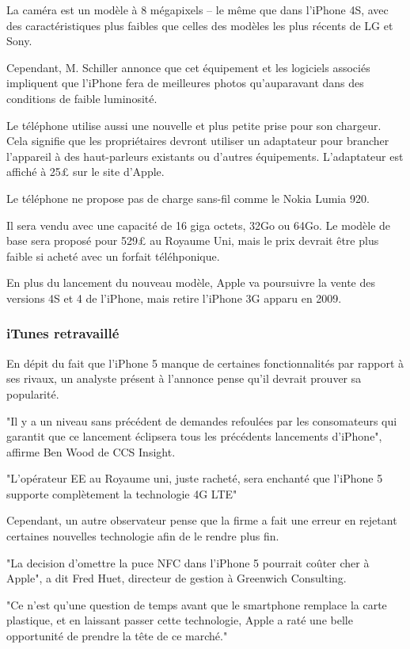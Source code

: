 \documentclass[a4paper, 11pt]{article}
\begin{document}
La caméra est un modèle à 8 mégapixels -- le même que dans l'iPhone 4S, avec des caractéristiques plus faibles que
celles des modèles les plus récents de LG et Sony.

Cependant, M. Schiller annonce que cet équipement et les logiciels associés impliquent que l'iPhone fera de
meilleures photos qu'auparavant dans des conditions de faible luminosité.

Le téléphone utilise aussi une nouvelle et plus petite prise pour son chargeur.
Cela signifie que les propriétaires devront utiliser un adaptateur pour brancher l'appareil à des haut-parleurs
existants ou d'autres équipements.
L'adaptateur est affiché à 25£ sur le site d'Apple.

Le téléphone ne propose pas de charge sans-fil comme le Nokia Lumia 920.

Il sera vendu avec une capacité de 16 giga octets, 32Go ou 64Go.
Le modèle de base sera proposé pour 529£ au Royaume Uni, mais le prix devrait être plus faible si acheté avec un forfait
téléhponique.

En plus du lancement du nouveau modèle, Apple va poursuivre la vente des versions 4S et 4 de l'iPhone, mais retire
l'iPhone 3G apparu en 2009.

\subsubsection*{iTunes retravaillé}

En dépit du fait que l'iPhone 5 manque de certaines fonctionnalités par rapport à ses rivaux, un analyste présent à
l'annonce pense qu'il devrait prouver sa popularité.

"Il y a un niveau sans précédent de demandes refoulées par les consomateurs qui garantit que ce lancement éclipsera
tous les précédents lancements d'iPhone", affirme Ben Wood de CCS Insight.

"L'opérateur EE au Royaume uni, juste racheté, sera enchanté que l'iPhone 5 supporte complètement la technologie 4G LTE"

Cependant, un autre observateur pense que la firme a fait une erreur en rejetant certaines nouvelles technologie afin de
le rendre plus fin.

"La decision d'omettre la puce NFC dans l'iPhone 5 pourrait coûter cher à Apple", a dit Fred Huet, directeur de gestion
à Greenwich Consulting.

"Ce n'est qu'une question de temps avant que le smartphone remplace la carte plastique, et en laissant passer cette
technologie, Apple a raté une belle opportunité de prendre la tête de ce marché."
\end{document}
